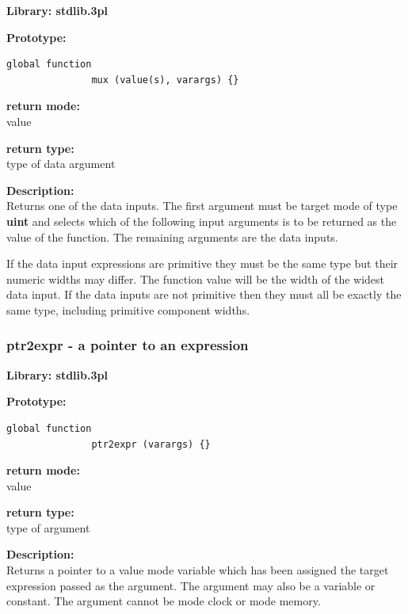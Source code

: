             {\bf Library: stdlib.3pl}

            {\bf Prototype:} \\
            \vsp
            \begin{lstlisting}[gobble=12, language=threepl]
               global function
               mux (value(s), varargs) {}
            \end{lstlisting}

            {\bf return mode:} \\
            value

            {\bf return type:} \\
            type of data argument

            {\bf Description:} \\
            Returns one of the data inputs. The first argument must be
            target mode of type {\bf uint} and selects which of the following
            input arguments is to be returned as the value of the function.
            The remaining arguments are the data inputs.

            If the data input expressions are primitive they must be the same
            type but their numeric widths may differ. The function value will be
            the width of the widest data input. If the data inputs are not
            primitive then they must all be exactly the same type, including
            primitive component widths.

        \subsubsection{ptr2expr - a pointer to an expression}\label{sec:lfptr2expr}

            {\bf Library: stdlib.3pl}

            {\bf Prototype:} \\
            \vsp
            \begin{lstlisting}[gobble=12, language=threepl]
               global function
               ptr2expr (varargs) {}
            \end{lstlisting}

            {\bf return mode:} \\
            value

            {\bf return type:} \\
            type of argument

            {\bf Description:} \\
            Returns a pointer to a value mode variable which has been
            assigned the target expression passed as the argument. The
            argument may also be a variable or constant. The argument
            cannot be mode clock or mode memory.


